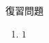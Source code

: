 \documentclass[12pt,a4paper]{jsarticle}
\begin{document}
復習問題
\begin{enumerate}
    \item $1$
\end{enumerate}
\end{document}
